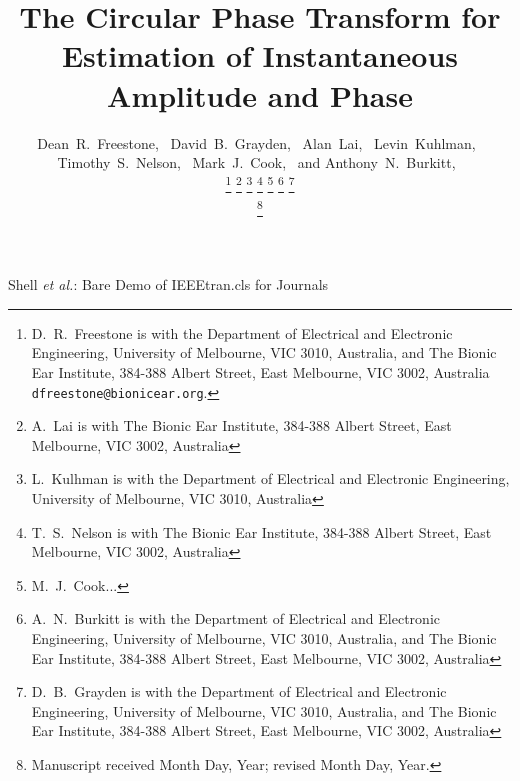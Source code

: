 \documentclass[a4paper]{IEEEtran}
\begin{document}
\title{The Circular Phase Transform for Estimation of Instantaneous Amplitude and Phase}

\author{Dean~R.~Freestone,~
		David~B.~Grayden,~
        Alan~Lai,~
        Levin~Kuhlman,~
        Timothy~S.~Nelson,~
        Mark~J.~Cook,~
        and Anthony~N.~Burkitt,~
        

\thanks{D.\ R.\ Freestone is with the Department
of Electrical and Electronic Engineering, University of Melbourne, VIC 3010, Australia, and The Bionic Ear Institute, 384-388 Albert Street, East Melbourne, VIC 3002, Australia {\tt\small dfreestone@bionicear.org}.}  %
\thanks{A.\ Lai is with The Bionic Ear Institute, 384-388 Albert Street, East Melbourne, VIC 3002, Australia}
\thanks{L.\ Kulhman is with the Department of Electrical and Electronic Engineering, University of Melbourne, VIC 3010, Australia}
\thanks{T.\ S.\ Nelson is with The Bionic Ear Institute, 384-388 Albert Street, East Melbourne, VIC 3002, Australia}
\thanks{M.\ J.\ Cook...}
\thanks{A.\ N.\ Burkitt is with the Department of Electrical and Electronic Engineering, University of Melbourne, VIC 3010, Australia, and The Bionic Ear Institute, 384-388 Albert Street, East Melbourne, VIC 3002, Australia}
\thanks{D.\ B.\ Grayden is with the Department of Electrical and Electronic Engineering, University of Melbourne, VIC 3010, Australia, and The Bionic Ear Institute, 384-388 Albert Street, East Melbourne, VIC 3002, Australia}

\thanks{Manuscript received Month Day, Year; revised Month Day, Year.}}


%
{Shell \MakeLowercase{\textit{et al.}}: Bare Demo of IEEEtran.cls for Journals}

\maketitle
\end{document}
